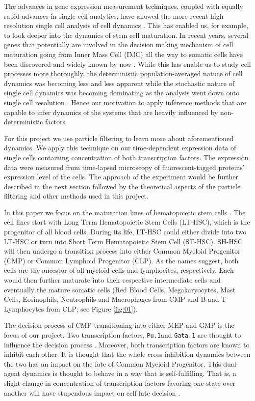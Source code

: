 \documentclass{bioinfo}
\begin{document}
The advances in gene expression measurement techniques, coupled with equally rapid advances in single cell analytics, have allowed the more recent high resolution single cell analysis of cell dynamics \citep{Feigelman16, Hoppe16}. This has enabled us, for example, to look deeper into the dynamics of stem cell maturation. In recent years, several genes that potentially are involved in the decision making mechanism of cell maturation going from Inner Mass Cell (IMC) all the way to somatic cells have been discovered and widely known by now \citep{Graf09}. While this has enable us to study cell processes more thoroughly, the deterministic population-averaged nature of cell dynamics was becoming less and less apparent while the stochastic nature of single cell dynamics was becoming dominating as the analysis went down onto single cell resolution \citep{Elowitz02}. Hence our motivation to apply inference methods that are capable to infer dynamics of the systems that are heavily influenced by non-deterministic factors.

For this project we use particle filtering to learn more about aforementioned dynamics. We apply this technique on our time-dependent expression data of single cells containing concentration of both transcription factors. The expression data were measured from time-lapsed microscopy of fluorescent-tagged proteins' expression level of the cells. The approach of the experiment would be further described in the next section followed by the theoretical aspects of the particle filtering and other methods used in this project.

In this paper we focus on the maturation lines of hematopoietic stem cells \citep{Orkin08}. The cell lines start with Long Term Hematopoietic Stem Cells (LT-HSC), which is the progenitor of all blood cells. During its life, LT-HSC could either divide into two LT-HSC or turn into Short Term Hematopoietic Stem Cell (ST-HSC). SH-HSC will then undergo a transition process into either Common Myeloid Progenitor (CMP) or Common Lymphoid Progenitor (CLP). As the names suggest, both cells are the ancestor of all myeloid cells and lymphocites, respectively. Each would then further maturate into their respective intermediate cells and eventually the mature somatic cells (Red Blood Cells, Megakaryocytes, Mast Cells, Eosinophils, Neutrophils and Macrophages from CMP and B and T Lymphocytes from CLP; see Figure \ref{fig:01}).

The decision process of CMP transitioning into either MEP and GMP is the focus of our project. Two transcription factors, \texttt{Pu.1}and \texttt{Gata.1} are thought to influence the decision process \citep{Graf09}. Moreover, both transcription factors are known to inhibit each other. It is thought that the whole cross inhibition dynamics between the two has an impact on the fate of Common Myeloid Progenitor. This dual-agent dynamics is thought to behave in a way that is self-fulfilling. That is, a slight change in concentration of transcription factors favoring one state over another will have stupendous impact on cell fate decision \citep{Zhang03}.
\end{document}
